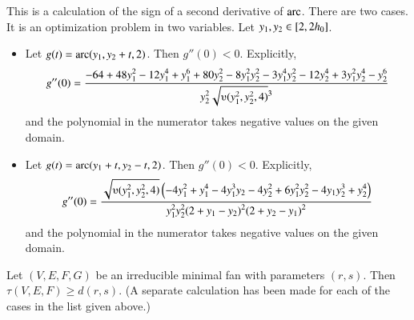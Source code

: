 \begin{calculation}\cutrate{}\label{calc:2der}
This is a
  calculation of the sign of a second derivative of $\operatorname{arc}$.  There are
  two cases.  It is an optimization problem in two variables.
Let $y_1,y_2\in [ 2,2{h_0}]$.  
\begin{itemize}\wasitemize 
\item 
Let $g(t) = \operatorname{arc}(y_1,y_2+t,2)$.  Then $g''(0) < 0$.
Explicitly,
\[ 
  g''(0) = \dfrac{
    -64 + 48y_1^2 - 12 y_1^4 + y_1^6 
  + 80 y_2^2 - 8 y_1^2 y_2^2 - 3 y_1^4 y_2^2
    - 12 y_2 ^4 + 3 y_1^2 y_2^4 - y_2^6
  }{y_2^2 \sqrt{\ups(y_1^2,y_2^2,4)}^3}
\] 
and the polynomial in the numerator takes negative values on the given
domain.
\item
Let $g(t) = \operatorname{arc}(y_1+t,y_2-t,2)$.  Then $g''(0) < 0$.
Explicitly,
\[ 
  g''(0) = \dfrac{\sqrt{\ups(y_1^2,y_2^2,4)} \left(
      -4 y_1^2 + y_1^4 - 4y_1^3 y_2 - 4y_2^2 
   + 6 y_1^2 y_2^2 - 4 y_1 y_2^3 +y_2^4
    \right)}{y_1^2 y_2^2 (2+y_1-y_2)^2 (2+y_2-y_1)^2}
\] 
and the polynomial in the numerator takes negative values on the given
domain.
\end{itemize}\wasitemize 
\end{calculation}



\begin{calculation}\cutrate{}\label{calc:irred} %
Let $(V,E,F,G)$ be an irreducible minimal fan with parameters
$(r,s)$.  Then $\tau(V,E,F) \ge d(r,s)$.  (A separate calculation
has been made for each of the cases in the list given above.)
\end{calculation}













